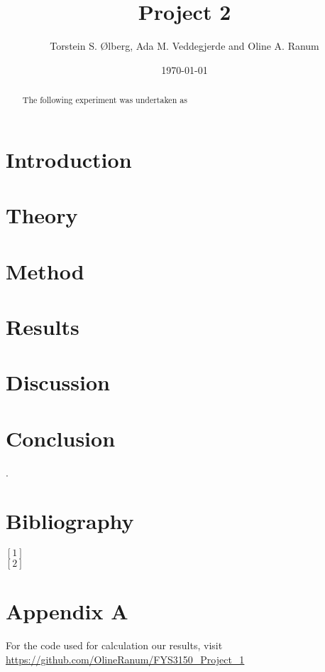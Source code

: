 \documentclass[%
reprint,
amsmath,amssymb,
aps,
]{revtex4-1}
\begin{document}
\title{Project 2}
\author{Torstein S. Ølberg, Ada M. Veddegjerde and Oline A. Ranum}
\date{\today}


\begin{abstract}
	The following experiment was undertaken as
\end{abstract}
\maketitle

\section*{Introduction}


\section*{Theory}

\section*{Method}

\section*{Results}

\section*{Discussion} 

\section*{Conclusion}


\newpage .
\newpage 
\onecolumngrid
\section*{Bibliography}
\noindent $[1]$ \\ 
$[2]$
\section*{Appendix A}
For the code used for calculation our results, visit
\url{https://github.com/OlineRanum/FYS3150_Project_1}
\end{document}
